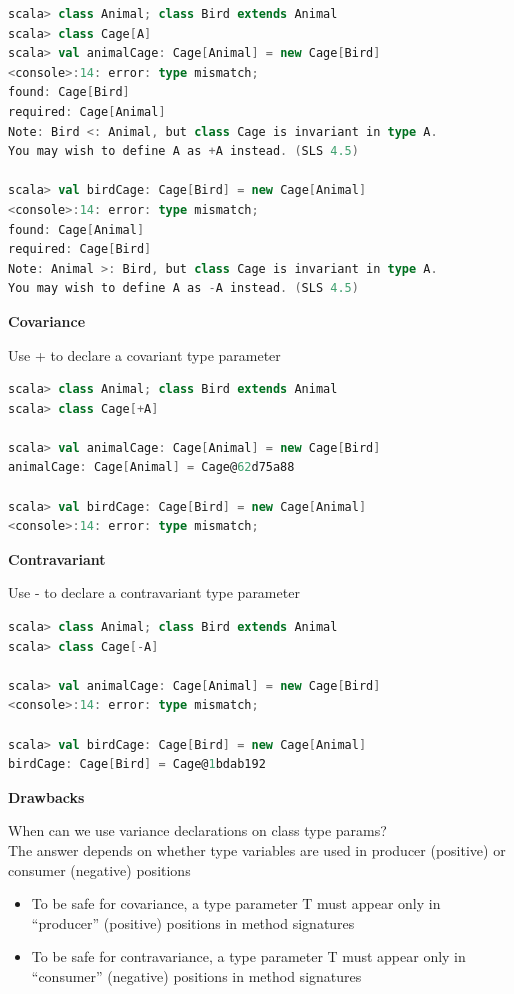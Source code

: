 \begin{lstlisting}[language=scala,mathescape=false]
scala> class Animal; class Bird extends Animal
scala> class Cage[A]
scala> val animalCage: Cage[Animal] = new Cage[Bird]
<console>:14: error: type mismatch;
found: Cage[Bird]
required: Cage[Animal]
Note: Bird <: Animal, but class Cage is invariant in type A.
You may wish to define A as +A instead. (SLS 4.5)

scala> val birdCage: Cage[Bird] = new Cage[Animal]
<console>:14: error: type mismatch;
found: Cage[Animal]
required: Cage[Bird]
Note: Animal >: Bird, but class Cage is invariant in type A.
You may wish to define A as -A instead. (SLS 4.5)
\end{lstlisting}

\textbf{Covariance} 

Use + to declare a covariant type parameter

\begin{lstlisting}[language=scala,mathescape=false]
scala> class Animal; class Bird extends Animal
scala> class Cage[+A]

scala> val animalCage: Cage[Animal] = new Cage[Bird]
animalCage: Cage[Animal] = Cage@62d75a88

scala> val birdCage: Cage[Bird] = new Cage[Animal]
<console>:14: error: type mismatch;
\end{lstlisting}

\textbf{Contravariant}

Use - to declare a contravariant type parameter

\begin{lstlisting}[language=scala,mathescape=false]
scala> class Animal; class Bird extends Animal
scala> class Cage[-A]

scala> val animalCage: Cage[Animal] = new Cage[Bird]
<console>:14: error: type mismatch;

scala> val birdCage: Cage[Bird] = new Cage[Animal]
birdCage: Cage[Bird] = Cage@1bdab192
\end{lstlisting}

\textbf{Drawbacks}

When can we use variance declarations on class type params?\\
The answer depends on whether type variables are used in producer
(positive) or consumer (negative) positions

\begin{itemize}
\tightlist
\item
  To be safe for covariance, a type parameter T must appear only in
  ``producer'' (positive) positions in method signatures
\item
  To be safe for contravariance, a type parameter T must appear only in
  ``consumer'' (negative) positions in method signatures
\end{itemize}

